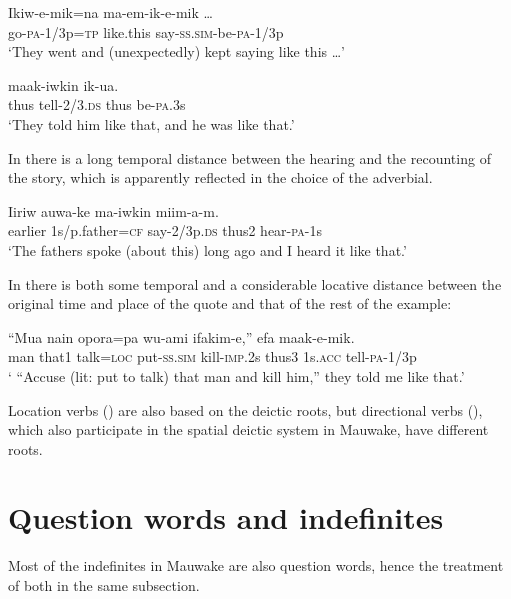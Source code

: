 \ea%
\label{ex:3:x701}
\gll Ikiw-e-mik=na  ma-em-ik-e-mik {\dots} \\
go-\textsc{pa}-1/3p=\textsc{tp} like.this say-\textsc{ss}.\textsc{sim}-be-\textsc{pa}-1/3p\\
\glt`They went and (unexpectedly) kept saying like this {\dots}'
\z

\ea%
\label{ex:3:x702}
\gll {} maak-iwkin  ik-ua. \\
thus tell-2/3.\textsc{ds} thus be-\textsc{pa}.3s\\
\glt`They told him like that, and he was like that.'
\z

In  there is a long temporal distance between the hearing and the recounting of the story, which is apparently reflected in the choice of the adverbial.

\ea%
\label{ex:3:x1857}
\gll Iiriw auwa-ke ma-iwkin  miim-a-m. \\
earlier 1s/p.father=\textsc{cf} say-2/3p.\textsc{ds} thus2 hear-\textsc{pa}-1s\\
\glt`The fathers spoke (about this) long ago and I heard it like that.'
\z

In  there is both some temporal and a considerable locative distance between the original time and place of the quote and that of the rest of the example: 

\ea%
\label{ex:3:x1858}
\gll ``Mua nain opora=pa wu-ami ifakim-e,''  efa maak-e-mik.\\
man that1 talk=\textsc{loc} put-\textsc{ss}.\textsc{sim} kill-\textsc{imp}.2s thus3 1s.\textsc{acc} tell-\textsc{pa}-1/3p\\
\glt` ``Accuse (lit: put to talk) that man and kill him,'' they told me like that.'
\z

Location verbs () are also based on the deictic roots, but directional verbs (), which also participate in the spatial deictic system in Mauwake, have different roots. 

\section{Question words and indefinites}\label{sec:3:7}
{}
Most of the indefinites in Mauwake are also question words, hence the treatment of both in the same subsection.

